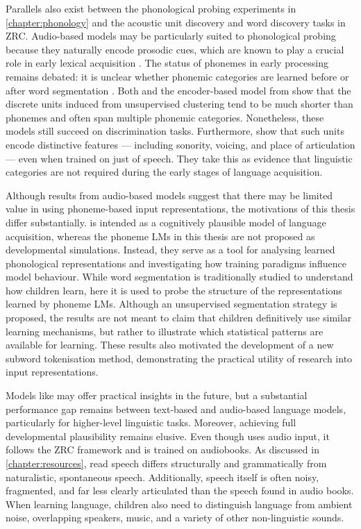 Parallels also exist between the phonological probing experiments in \cref{chapter:phonology} and the acoustic unit discovery and word discovery tasks in ZRC. Audio-based models may be particularly suited to phonological probing because they naturally encode prosodic cues, which are known to play a crucial role in early lexical acquisition \citep{Cutler1987, Jusczyk1993stress, jusczyk-1999-stress-voice}. The status of phonemes in early processing remains debated: it is unclear whether phonemic categories are learned before or after word segmentation \citep{kazanina2018phonemes, matusevych2023infant}. Both \stela and the encoder-based model from \citet{schatz2021early} show that the discrete units induced from unsupervised clustering tend to be much shorter than phonemes and often span multiple phonemic categories. Nonetheless, these models still succeed on discrimination tasks. Furthermore, \citet{lavechin2025simulating} show that such units encode distinctive features --- including sonority, voicing, and place of articulation --- even when trained on just  of speech. They take this as evidence that linguistic categories are not required during the early stages of language acquisition.

Although results from audio-based models suggest that there may be limited value in using phoneme-based input representations, the motivations of this thesis differ substantially. \stela is intended as a cognitively plausible model of language acquisition, whereas the phoneme LMs in this thesis are not proposed as developmental simulations. Instead, they serve as a tool for analysing learned phonological representations and investigating how training paradigms influence model behaviour. While word segmentation is traditionally studied to understand how children learn, here it is used to probe the structure of the representations learned by phoneme LMs. Although an unsupervised segmentation strategy is proposed, the results are not meant to claim that children definitively use similar learning mechanisms, but rather to illustrate which statistical patterns are available for learning. These results also motivated the development of a new subword tokenisation method, demonstrating the practical utility of research into input representations.

Models like \stela may offer practical insights in the future, but a substantial performance gap remains between text-based and audio-based language models, particularly for higher-level linguistic tasks. Moreover, achieving full developmental plausibility remains elusive. Even though \stela uses audio input, it follows the ZRC framework and is trained on audiobooks. As discussed in \cref{chapter:resources}, read speech differs structurally and grammatically from naturalistic, spontaneous speech. Additionally, speech itself is often noisy, fragmented, and far less clearly articulated than the speech found in audio books. When learning language, children also need to distinguish language from ambient noise, overlapping speakers, music, and a variety of other non-linguistic sounds.


